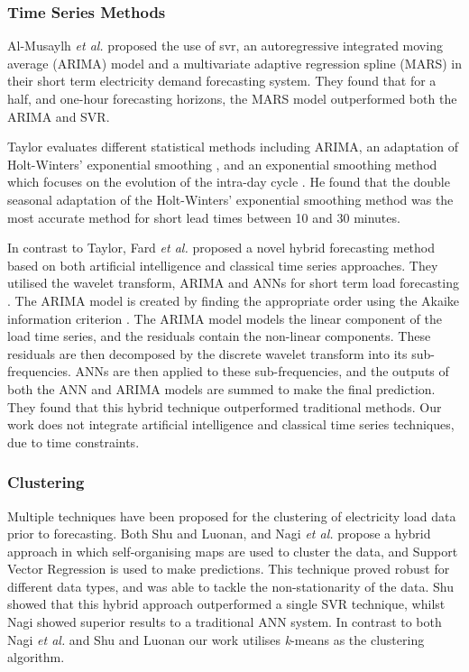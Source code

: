 \subsubsection{Time Series Methods}

Al-Musaylh \textit{et al.} \cite{Al-Musaylh2018} proposed the use of \acrfull{svr}, an autoregressive integrated moving average (ARIMA) model and a multivariate adaptive regression spline (MARS) in their short term electricity demand forecasting system. They found that for a half, and one-hour forecasting horizons, the MARS model outperformed both the ARIMA and SVR.

Taylor \cite{Taylor2008} evaluates different statistical methods including ARIMA, an adaptation of Holt-Winters' exponential smoothing \cite{Holt2004}, and an exponential smoothing method which focuses on the evolution of the intra-day cycle . He found that the double seasonal adaptation of the Holt-Winters' exponential smoothing method was the most accurate method for short lead times between 10 and 30 minutes. 

In contrast to Taylor, Fard \textit{et al.} \cite{Fard2014} proposed a novel hybrid forecasting method based on both artificial intelligence and classical time series approaches. They utilised the wavelet transform, ARIMA and ANNs for short term load forecasting . The ARIMA model is created by finding the appropriate order using the Akaike information criterion \cite{Akaike1974}. The ARIMA model models the linear component of the load time series, and the residuals contain the non-linear components. These residuals are then decomposed by the discrete wavelet transform into its sub-frequencies. ANNs are then applied to these sub-frequencies, and the outputs of both the ANN and ARIMA models are summed to make the final prediction. They found that this hybrid technique outperformed traditional methods. Our work does not integrate artificial intelligence and classical time series techniques, due to time constraints.

\subsubsection{Clustering}

Multiple techniques have been proposed for the clustering of electricity load data prior to forecasting. Both Shu \cite{Shu2006} and Luonan, and Nagi \textit{et al.} \cite{Tiong2008} propose a hybrid approach in which self-organising maps are used to cluster the data, and Support Vector Regression is used to make predictions. This technique proved robust for different data types, and was able to tackle the non-stationarity of the data. Shu showed that this hybrid approach outperformed a single SVR technique, whilst Nagi showed superior results to a traditional ANN system. In contrast to both Nagi \textit{et al.} and Shu and Luonan our work utilises \textit{k}-means as the clustering algorithm. 

